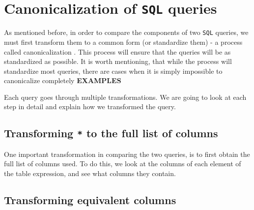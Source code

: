 \section{Canonicalization of \texttt{SQL} queries}

As mentioned before, in order to compare the components of two \texttt{SQL} queries, we must first transform them to a common form (or standardize them) - a process called canonicalization \citep{literature:xdata}. This process will ensure that the queries will be as standardized as possible. It is worth mentioning, that while the process will standardize most queries, there are cases when it is simply impossible to canonicalize completely \textbf{EXAMPLES}

Each query goes through multiple transformations. We are going to look at each step in detail and explain how we transformed the query.

\subsection{Transforming \texttt{*} to the full list of columns}

One important transformation in comparing the two queries, is to first obtain the full list of columns used. To do this, we look at the columns of each element of the table expression, and see what columns they contain.

\subsection{Transforming equivalent columns}
